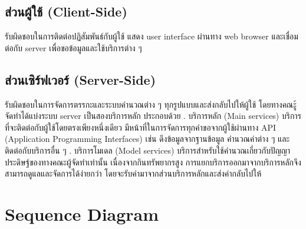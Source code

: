 \subsection{ส่วนผู้ใช้ (Client-Side)}
รับผิดชอบในการติดต่อปฏิสัมพันธ์กับผู้ใช้ แสดง user interface ผ่านทาง web browser และเชื่อมต่อกับ server เพื่อขอข้อมูลและใช้บริการต่าง ๆ

\subsection{ส่วนเซิร์ฟเวอร์ (Server-Side)}
รับผิดชอบในการจัดการตรรกะและระบบคำนวณต่าง ๆ ทุกรูปแบบและส่งกลับไปให้ผู้ใช้ โดยทางคณะู้จัดทำได้แบ่งระบบ server เป็นสองบริการหลัก ประกอบด้วย
. บริการหลัก (Main services)
\newline
บริการที่จะติดต่อกับผู้ใช้โดยตรงเพียงหนึ่งเดียว มีหน้าที่ในการจัดการทุกคำขอจากผู้ใช้ผ่านทาง API (Application Programming Interfaces) เช่น ดึงข้อมูลจากฐานข้อมูล คำนวณค่าต่าง ๆ และติดต่อกับบริการอื่น ๆ
. บริการโมเดล (Model services)
\newline
บริการสำหรับใช้คำนวณเกี่ยวกับปัญญาประดิษฐ์ของทางคณะผู้จัดทำเท่านั้น เนื่องจากกินทรัพยากรสูง การแยกบริการออกมาจากบริการหลักจึงสามารถดูแลและจัดการได้ง่ายกว่า โดยจะรับค่ามาจากส่วนบริการหลักและส่งค่ากลับไปให้


\section{Sequence Diagram}
